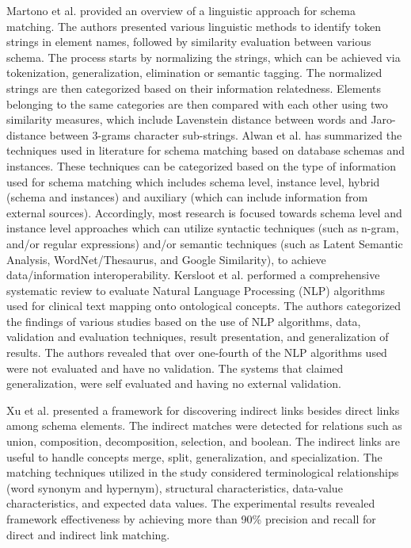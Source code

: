\documentclass{ieeeaccess}
\begin{document}
Martono et al. \cite{martono2017review} provided an overview of a linguistic approach for schema matching. The authors presented various linguistic methods to identify token strings in element names, followed by similarity evaluation between various schema. The process starts by normalizing the strings, which can be achieved via tokenization, generalization, elimination or semantic tagging. The normalized strings are then categorized based on their information relatedness. Elements belonging to the same categories are then compared with each other using two similarity measures, which include Lavenstein distance between words and Jaro-distance between 3-grams character sub-strings. Alwan et al. \cite{alwan2017survey} has summarized the techniques used in literature for schema matching based on database schemas and instances. These techniques can be categorized based on the type of information used for schema matching which includes  schema level, instance level, hybrid (schema and instances) and auxiliary (which can include information from external sources). Accordingly, most research is focused towards schema level and instance level approaches which can utilize syntactic techniques (such as n-gram, and/or regular expressions) and/or semantic techniques (such as Latent Semantic Analysis, WordNet/Thesaurus, and Google Similarity), to achieve data/information interoperability.  Kersloot et al. \cite{kersloot2020natural} performed a comprehensive systematic review to evaluate Natural Language Processing (NLP) algorithms used for clinical text mapping onto ontological concepts. The authors categorized the findings of various studies based on the use of NLP algorithms, data, validation and evaluation techniques, result presentation, and generalization of results. The authors revealed that over one-fourth of the NLP algorithms used were not evaluated and have no validation. The systems that claimed generalization, were self evaluated and having no external validation.  

Xu et al. \cite{xu2003discovering} presented a framework for discovering indirect links besides direct links among schema elements. The indirect matches were detected for relations such as union, composition, decomposition, selection, and boolean. The indirect links are useful to handle concepts merge, split, generalization, and specialization. The matching techniques utilized in the study considered terminological relationships (word synonym and hypernym), structural characteristics, data-value characteristics, and expected data values. The experimental results revealed framework effectiveness by achieving more than 90\% precision and recall for direct and indirect link matching. 
\end{document}

